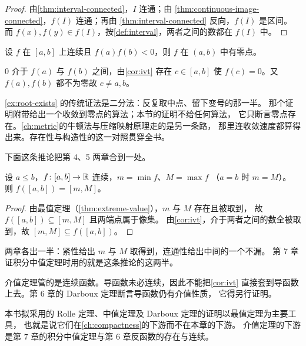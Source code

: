\begin{proof}
  由\cref{thm:interval-connected}，\(I\) 连通；由%
  \cref{thm:continuous-image-connected}，\(f(I)\) 连通；再由%
  \cref{thm:interval-connected} 反向，\(f(I)\) 是区间。
  而 \(f(x),f(y) \in f(I)\)，按\cref{def:interval}，两者之间的数都在 \(f(I)\) 中。
\end{proof}

\begin{example}[零点存在]
  \label{ex:root-exists}
  设 \(f\) 在 \([a,b]\) 上连续且 \(f(a)f(b)<0\)，则 \(f\) 在 \((a,b)\) 中有零点。
  \begin{worked}
    \(0\) 介于 \(f(a)\) 与 \(f(b)\) 之间，由\cref{cor:ivt} 存在 \(c \in [a,b]\)
    使 \(f(c)=0\)。又 \(f(a),f(b)\) 都不为零故 \(c \neq a,b\)。
  \end{worked}
\end{example}

\begin{remark}
  \cref{ex:root-exists} 的传统证法是二分法：反复取中点、留下变号的那一半。
  那个证明附带给出一个收敛到零点的算法；本节的证明不给任何算法，
  它只断言零点存在。\cref{ch:metric}的牛顿法与压缩映射原理走的是另一条路，
  那里连收敛速度都算得出来。存在性与构造性的这一对照贯穿全书。
\end{remark}

下面这条推论把第 4、5 两章合到一处。

\begin{corollary}[紧区间上的像仍是紧区间]
  \label{cor:image-compact-interval}
  设 \(a \le b\)，\(f \colon [a,b] \to \mathbb{R}\) 连续，\(m = \min f\)、\(M = \max f\)
  （\(a=b\) 时 \(m=M\)）。
  则 \(f([a,b]) = [m,M]\)。
\end{corollary}

\begin{proof}
  由最值定理（\cref{thm:extreme-value}），\(m\) 与 \(M\) 存在且被取到，
  故 \(f([a,b]) \subseteq [m,M]\) 且两端点属于像集。
  由\cref{cor:ivt}，介于两者之间的数全被取到，故 \([m,M] \subseteq f([a,b])\)。
\end{proof}

\begin{remark}
  两章各出一半：紧性给出 \(m\) 与 \(M\) 取得到，连通性给出中间的一个不漏。
  第 7 章证积分中值定理时用的就是这条推论的这两半。
\end{remark}

\begin{pitfall}
  介值定理管的是连续函数。导函数未必连续，因此不能把\cref{cor:ivt}
  直接套到导函数上去。第 6 章的 Darboux 定理断言导函数仍有介值性质，
  它得另行证明。

  本书拟采用的 Rolle 定理、中值定理及 Darboux 定理的证明以最值定理为主要工具，
  也就是说它们在\cref{ch:compactness}的下游而不在本章的下游。
  介值定理的下游是第 7 章的积分中值定理与第 6 章反函数的存在与连续。
\end{pitfall}

